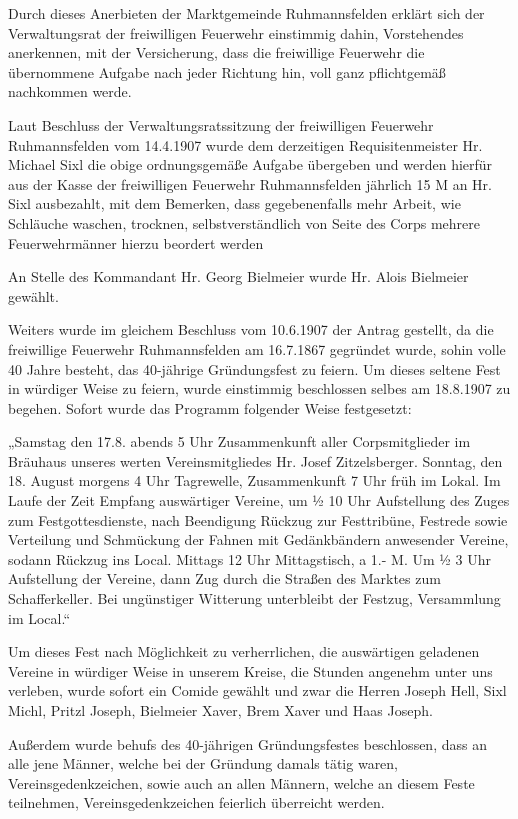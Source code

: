 \documentclass[12pt,a4paper]{book}
\begin{document}
Durch dieses Anerbieten der Marktgemeinde Ruhmannsfelden erklärt sich der
Verwaltungsrat der freiwilligen Feuerwehr einstimmig dahin, Vorstehendes
anerkennen, mit der Versicherung, dass die freiwillige Feuerwehr die übernommene
Aufgabe nach jeder Richtung hin, voll ganz pflichtgemäß nachkommen werde.

Laut Beschluss der Verwaltungsratssitzung der freiwilligen Feuerwehr
Ruhmannsfelden vom 14.4.1907 wurde dem derzeitigen Requisitenmeister Hr. Michael
Sixl die obige ordnungsgemäße Aufgabe übergeben und werden hierfür aus der Kasse
der freiwilligen Feuerwehr Ruhmannsfelden jährlich 15 M an Hr. Sixl ausbezahlt,
mit dem Bemerken, dass gegebenenfalls mehr Arbeit, wie Schläuche waschen,
trocknen, selbstverständlich von Seite des Corps mehrere Feuerwehrmänner hierzu
beordert werden

An Stelle des Kommandant Hr. Georg Bielmeier wurde Hr. Alois Bielmeier gewählt.

Weiters wurde im gleichem Beschluss vom 10.6.1907 der Antrag gestellt, da die
freiwillige Feuerwehr Ruhmannsfelden am 16.7.1867 gegründet wurde, sohin volle
40 Jahre besteht, das 40-jährige Gründungsfest zu feiern. Um dieses seltene Fest
in würdiger Weise zu feiern, wurde einstimmig beschlossen selbes am 18.8.1907 zu
begehen. Sofort wurde das Programm folgender Weise festgesetzt:

„Samstag den 17.8. abends 5 Uhr Zusammenkunft aller Corpsmitglieder im Bräuhaus
unseres werten Vereinsmitgliedes Hr. Josef Zitzelsberger. Sonntag, den 18.
August morgens 4 Uhr Tagrewelle, Zusammenkunft 7 Uhr früh im Lokal. Im Laufe der
Zeit Empfang auswärtiger Vereine, um ½ 10 Uhr Aufstellung des Zuges zum
Festgottesdienste, nach Beendigung Rückzug zur Festtribüne, Festrede sowie
Verteilung und Schmückung der Fahnen mit Gedänkbändern anwesender Vereine,
sodann Rückzug ins Local. Mittags 12 Uhr Mittagstisch, a 1.- M. Um ½ 3 Uhr
Aufstellung der Vereine, dann Zug durch die Straßen des Marktes zum
Schafferkeller. Bei ungünstiger Witterung unterbleibt der Festzug, Versammlung
im Local.“

Um dieses Fest nach Möglichkeit zu verherrlichen, die auswärtigen geladenen
Vereine in würdiger Weise in unserem Kreise, die Stunden angenehm unter uns
verleben, wurde sofort ein Comide gewählt und zwar die Herren Joseph Hell, Sixl
Michl, Pritzl Joseph, Bielmeier Xaver, Brem Xaver und Haas Joseph.

Außerdem wurde behufs des 40-jährigen Gründungsfestes beschlossen, dass an alle
jene Männer, welche bei der Gründung damals tätig waren, Vereinsgedenkzeichen,
sowie auch an allen Männern, welche an diesem Feste teilnehmen,
Vereinsgedenkzeichen feierlich überreicht werden.
\end{document}
